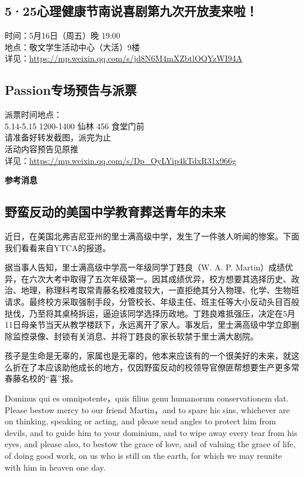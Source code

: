 \documentclass[letterpaper, 12pt]{article}
\begin{document}
\begin{multicols}{2}
\subsection{5·25心理健康节南说喜剧第九次开放麦来啦！} %
时间：5月16日（周五）晚 19:00
\\地点：敬文学生活动中心（大活）9楼
\\详见：\url{https://mp.weixin.qq.com/s/jd8N6M4mXZbtlOQYzWI94A}
\subsection{Passion专场预告与派票} %
派票时间地点：
\\5.14-5.15 1200-1400 仙林 456 食堂门前
\\请准备好转发截图，派完为止
\\活动内容预告见原推
\\详见：\url{https://mp.weixin.qq.com/s/Dp_OyLYip4kTdxR31x966g}
\end{multicols}
\centerline{\huge\textbf{参考消息}}
\begin{multicols}{2}
\section{野蛮反动的美国中学教育葬送青年的未来}
近日，在美国北弗吉尼亚州的里士满高级中学，发生了一件骇人听闻的惨案。下面我们看看来自YTCA的报道。

据当事人告知，里士满高级中学高一年级同学丁韪良（W. A. P. Martin）成绩优异，在六次大考中取得了五次年级第一。因其成绩优异，校方想要其选择历史、政治、地理，称理科考取常青藤名校难度较大，一直拒绝其分入物理、化学、生物班请求。最终校方采取强制手段，分管校长、年级主任、班主任等大小反动头目百般挞伐，乃至将其桌椅拆运，逼迫该同学选择历政地。丁韪良难抵强压，决定在5月11日母亲节当天从教学楼跃下，永远离开了家人。事发后，里士满高级中学立即删除监控录像、封锁有关消息、并将丁韪良的家长软禁于里士满大剧院。

孩子是生命是无辜的，家属也是无辜的，他本来应该有的一个很美好的未来，就这么折在了本应该助他成长的地方，仅因野蛮反动的校领导官僚匪帮想要生产更多常春藤名校的“喜”报。

Dominus qui es omnipotente，quis filius genu humanorum conservationem dat. Please bestow mercy to our friend Martin，and to spare his sins, whichever are on thinking, speaking or acting, and please send angles to protect him from devils, and to guide him to your dominium, and to wipe away every tear from his eyes, and please also, to bestow the grace of love, and of valuing the grace of life, of doing good work, on us who is still on the earth, for which we may reunite with him in heaven one day.
\end{multicols}
\end{document}
